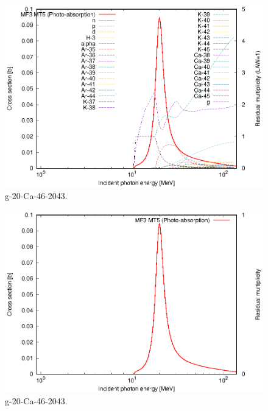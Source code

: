 \begin{figure}
 \includegraphics[width=\linewidth]{eps/g_20-Ca-46_2043.eps}
  \caption{g-20-Ca-46-2043.}
\end{figure}
\begin{figure}
 \includegraphics[width=\linewidth]{eps-law0/g_20-Ca-46_2043.eps}
 \caption{g-20-Ca-46-2043.}
\end{figure}
\newpage \clearpage

